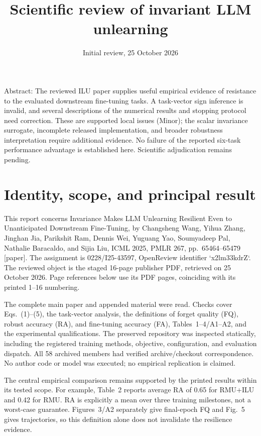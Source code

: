 \documentclass[10pt]{article}
\title{Scientific review of invariant LLM unlearning}
\author{}
\date{Initial review, 25 October 2026}
\begin{document}
\maketitle
Abstract: The reviewed ILU paper supplies useful empirical evidence of resistance to the evaluated downstream fine-tuning tasks. A task-vector sign inference is invalid, and several descriptions of the numerical results and stopping protocol need correction. These are supported local issues (Minor); the scalar invariance surrogate, incomplete released implementation, and broader robustness interpretation require additional evidence. No failure of the reported six-task performance advantage is established here. Scientific adjudication remains pending.\par
\section*{Identity, scope, and principal result}
This report concerns Invariance Makes LLM Unlearning Resilient Even to Unanticipated Downstream Fine-Tuning, by Changsheng Wang, Yihua Zhang, Jinghan Jia, Parikshit Ram, Dennis Wei, Yuguang Yao, Soumyadeep Pal, Nathalie Baracaldo, and Sijia Liu, ICML 2025, PMLR 267, pp. 65464–65479 [paper]. The assignment is 0228/I25-43597, OpenReview identifier `x2lm33kdrZ`. The reviewed object is the staged 16-page publisher PDF, retrieved on 25 October 2026. Page references below use its PDF pages, coinciding with its printed 1–16 numbering.\par
The complete main paper and appended material were read. Checks cover Eqs. (1)–(5), the task-vector analysis, the definitions of forget quality (FQ), robust accuracy (RA), and fine-tuning accuracy (FA), Tables 1–4/A1–A2, and the experimental qualifications. The preserved repository was inspected statically, including the registered training methods, objective, configuration, and evaluation dispatch. All 58 archived members had verified archive/checkout correspondence. No author code or model was executed; no empirical replication is claimed.\par
The central empirical comparison remains supported by the printed results within its tested scope. For example, Table 2 reports average RA of 0.65 for RMU+ILU and 0.42 for RMU. RA is explicitly a mean over three training milestones, not a worst-case guarantee. Figures 3/A2 separately give final-epoch FQ and Fig. 5 gives trajectories, so this definition alone does not invalidate the resilience evidence.\par
\end{document}

